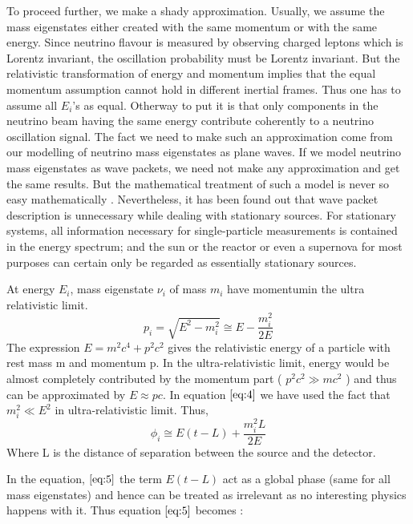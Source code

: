 \documentclass[12pt,a4paper]{report}
\begin{document}
To proceed further, we make a shady approximation. Usually, we assume the mass eigenstates either created with the same momentum or with the same energy. Since neutrino flavour is measured by observing charged leptons which is Lorentz invariant, the oscillation probability must be Lorentz invariant. But the relativistic transformation of energy and momentum implies that the equal momentum assumption cannot hold in different inertial frames\cite{giunti2003}. Thus one has to assume all $E_{i}$’s as equal\cite{stodolsky}\cite{lipkin}\cite{obkun}. Otherway to put it is that only components in the neutrino beam having the same energy contribute coherently to a neutrino oscillation signal.  The fact we need to make such an approximation come from our modelling of neutrino mass eigenstates as plane waves. If we model neutrino mass eigenstates as wave packets, we need not make any approximation and get the same results. But the mathematical treatment of such a model is never so easy mathematically \cite{giunti1991}\cite{giunti1998}\cite{giunti2004}. Nevertheless, it has been found out that wave packet description is unnecessary while dealing with stationary sources. For stationary systems, all information necessary for single-particle measurements is contained in the energy spectrum; and the sun or the reactor or even a supernova for most purposes can certain only be regarded as essentially stationary sources\cite{stodolsky}. \par
At energy $E_{i}$, mass eigenstate $\nu_{i}$ of mass $m_{i}$ have momentumin the ultra relativistic limit.
\begin{equation}
\label{eq:4}
p_{i} = \sqrt{ E^{2} - m_{i}^{2}} \cong E-\frac{m_{i}^{2}}{2E}
\end{equation}
The expression $E = m^{2}c^{4} + p^{2}c^{2}$ gives the relativistic energy of a particle with rest mass m and momentum p. In the ultra-relativistic limit, energy would be almost completely contributed by the momentum part ( $ p^{2}c^{2} \gg mc^{2}$ ) and thus can be approximated by $ E \approx pc $. In equation $\ref{eq:4}$ we have used the fact that $m_{i}^2 \ll E^{2}$ in ultra-relativistic limit. Thus,
\begin{equation}
\label{eq:5}
\phi_{i} \cong E( t - L) + \frac{m_{i}^2 L}{2E}
\end{equation}
Where L is the distance of separation between the source and the detector.\par
In the equation, $\ref{eq:5}$  the term $ E( t - L)$ act as a global phase (same for all mass eigenstates) and hence can be treated as irrelevant as no interesting physics happens with it. Thus equation $\ref{eq:5}$ becomes :
\end{document}
